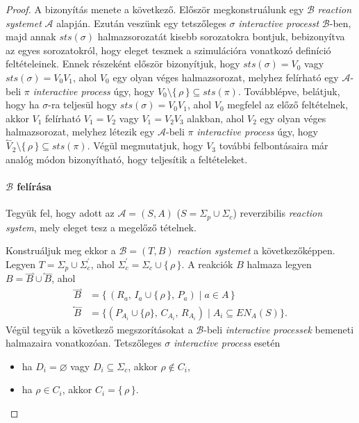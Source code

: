\documentclass[12pt]{article}
\theoremstyle{definition}
\theoremstyle{remark}
\theoremstyle{plain}
\theoremstyle{remark}
\theoremstyle{plain}
\let\emptyset\varnothing
\newcommand{\forwardhat}{\overset{\rightharpoonup}}
\newcommand{\backwardhat}{\overset{\leftharpoonup}}
\newcommand{\reaction}[3]{
    (#1, \, #2, \, #3)
}
\begin{document}
    \begin{proof}
        A bizonyítás menete a következő. Először megkonstruálunk egy $\mathscr{B}$ \textit{reaction systemet} $\mathscr{A}$ alapján. Ezután veszünk egy tetszőleges $\sigma$ \textit{interactive processt} $\mathscr{B}$-ben, majd annak $\textit{sts}(\sigma)$ halmazsorozatát kisebb sorozatokra bontjuk, bebizonyítva az egyes sorozatokról, hogy eleget tesznek a szimulációra vonatkozó definíció feltételeinek. Ennek részeként először bizonyítjuk, hogy $\textit{sts}(\sigma)=V_{0}$ vagy $\textit{sts}(\sigma)=V_{0}V_{1}$, ahol $V_{0}$ egy olyan véges halmazsorozat, melyhez felírható egy $\mathscr{A}$-beli $\pi$ \textit{interactive process} úgy, hogy $V_{0} \setminus \{ \, \rho \, \} \subseteq \textit{sts}(\pi)$. Továbblépve, belátjuk, hogy ha $\sigma$-ra teljesül hogy $\textit{sts}(\sigma)=V_{0}V_{1}$, ahol $V_{0}$ megfelel az előző feltételnek, akkor $V_{1}$ felírható $V_{1}=V_{2}$ vagy $V_{1}=V_{2}V_{3}$ alakban, ahol $V_{2}$ egy olyan véges halmazsorozat, melyhez létezik egy $\mathscr{A}$-beli $\pi$ \textit{interactive process} úgy, hogy $\backwardhat V_{2} \setminus \{ \,\rho\, \} \subseteq \textit{sts}(\pi)$. Végül megmutatjuk, hogy $V_{3}$ további felbontásaira már analóg módon bizonyítható, hogy teljesítik a feltételeket.

        \paragraph{$\mathscr{B}$ felírása}
        Tegyük fel, hogy adott az $\mathscr{A} = (S, A)$ ($S = \Sigma_{p} \cup \Sigma_{c}$) reverzibilis \textit{reaction system}, mely eleget tesz a megelőző tételnek.
        
        Konstruáljuk meg ekkor a $\mathscr{B} = (T, B)$ \textit{reaction systemet} a következőképpen. Legyen $T = \Sigma_{p} \cup \Sigma^{\prime}_{c}$, ahol $\Sigma^{\prime}_{c} = \Sigma_{c} \cup \{ \, \rho \, \}$. A reakciók $B$ halmaza legyen $B = \forwardhat B \cup \backwardhat B$, ahol
        \begin{align*}
            \forwardhat B &= \{ \, \reaction{R_{a}}{I_{a} \cup \{ \, \rho \, \}}{P_{a}} \;|\; a \in A \, \} \\
            \backwardhat B &= \{ \reaction{P_{A_{i}} \cup \{ \rho \}}{C_{A_{i}}}{R_{A_{i}}} \;|\; A_{i} \subseteq \textit{EN}_{A}(S) \}.
        \end{align*}
        Végül tegyük a következő megszorításokat a $\mathscr{B}$-beli \textit{interactive processek} bemeneti halmazaira vonatkozóan. Tetszőleges $\sigma$ \textit{interactive process} esetén
        \begin{itemize}
            \item
            ha $D_{i} = \emptyset$ vagy $D_{i} \subseteq \Sigma_{c}$, akkor $\rho \notin C_{i}$,
            \item
            ha $\rho \in C_{i}$, akkor $C_{i} = \{ \,\rho\, \}$.
        \end{itemize}
        

\end{proof}
\end{document}
